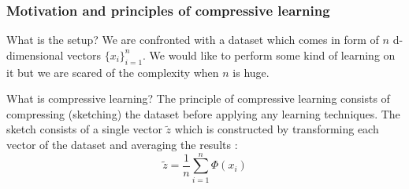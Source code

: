 	\begin{frame}
		\frametitle{Motivation and principles of compressive learning}
		
		\begin{block}{What is the setup?}
			We are confronted with a dataset which comes in form of $n$ d-dimensional vectors {$\{x_{i}\}_{i = 1}^{n}$}. We would like to perform some kind of learning on it but we are scared of the complexity when $n$ is huge.
			
		\end{block}
		
		\begin{block}{What is compressive learning?}
			The principle of compressive learning consists of compressing (sketching) the dataset before applying any learning techniques. The sketch consists of a single vector $\tilde{z}$ which is constructed by transforming each vector of the dataset and averaging the results :
			$$
			\tilde{z} = \frac{1}{n}\sum_{i = 1}^{n} \Phi(x_{i})
			$$
		\end{block}
	\end{frame}
	
